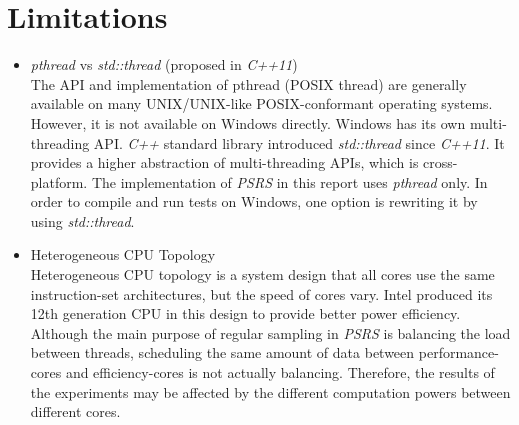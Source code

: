 \documentclass[11pt]{article}
\begin{document}
    \section{Limitations}
    \label{sec:section-5}
    \begin{itemize}
        \item \textit{pthread} vs \textit{std::thread} (proposed in \textit{C++11}) \\ The API and implementation of pthread (POSIX thread) are generally available on many UNIX/UNIX-like POSIX-conformant operating systems.
        However, it is not available on Windows directly\cite{pthread}.
        Windows has its own multi-threading API. \textit{C++} standard library introduced \textit{std::thread} since \textit{C++11}.
        It provides a higher abstraction of multi-threading APIs, which is cross-platform.
        The implementation of \textit{PSRS} in this report uses \textit{pthread} only.
        In order to compile and run tests on Windows, one option is rewriting it by using \textit{std::thread}.
        \item Heterogeneous CPU Topology \\ Heterogeneous CPU topology is a system design that all cores use the same instruction-set architectures, but the speed of cores vary\cite{heterogeneous}.
        Intel produced its 12th generation CPU in this design to provide better power efficiency.
        Although the main purpose of regular sampling in \textit{PSRS} is balancing the load between threads, scheduling the same amount of data between performance-cores and efficiency-cores is not actually balancing.
        Therefore, the results of the experiments may be affected by the different computation powers between different cores.
    \end{itemize}

    
    
\end{document}
